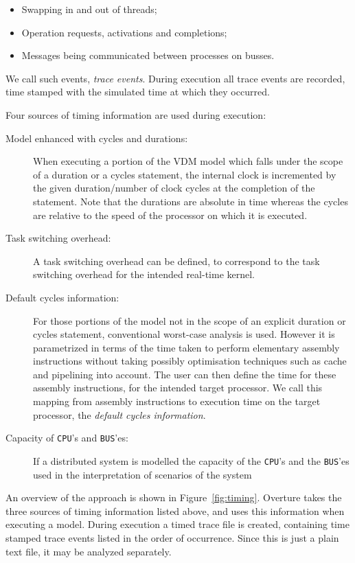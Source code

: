 \documentclass{overturerepchap}
\begin{document}
\begin{itemize}
\item Swapping in and out of threads;
\item Operation requests, activations and completions;
\item Messages being communicated between processes on busses.
\end{itemize}

We call such events, \emph{trace events}. During execution all trace
events are recorded, time stamped with the simulated time at which
they occurred.

Four sources of timing information are used during execution:

\begin{description}
\item[Model enhanced with cycles and durations:] When executing a 
portion of the VDM model which falls under the scope of a duration
or a cycles statement, the internal clock is incremented by the given
duration/number of clock cycles at the completion of the
statement. Note that the durations are absolute in time whereas the
cycles are relative to the speed of the processor on which it is
executed.
\item[Task switching overhead:] A task switching overhead can be
defined, to correspond to the task switching overhead for the intended
real-time kernel.
\item[Default cycles information:] For those portions of the model
not in the scope of an explicit duration or cycles statement, conventional worst-case
analysis is used. However it is parametrized in terms of the time
taken to perform elementary assembly instructions without taking
possibly optimisation techniques such as cache and pipelining into
account. The user can then define the time for these assembly
instructions, for the intended target processor. We call this mapping
from assembly instructions to execution time on the target processor,
the \emph{default cycles information}.
\item[Capacity of \texttt{CPU}'s and \texttt{BUS}'es:] If a distributed system is modelled
the capacity of the \texttt{CPU}'s and the \texttt{BUS}'es used in the
interpretation of scenarios of the system
\end{description}

An overview of the approach is shown in
Figure~\ref{fig:timing}. Overture
takes the three sources of timing information
listed above, and uses this information when executing a model. During
execution a timed trace file is created, containing time stamped trace
events listed in the order of occurrence. Since this is just a plain
text file, it may be analyzed separately.
\end{document}
